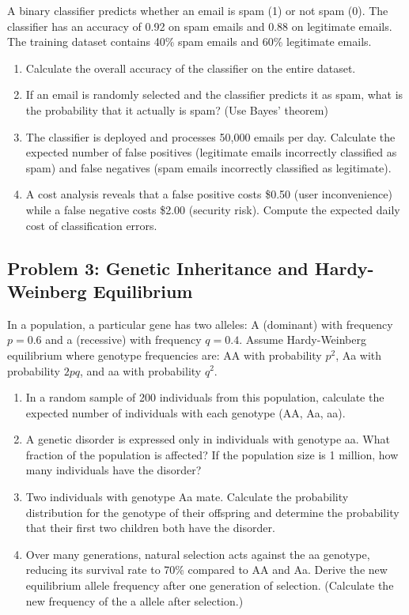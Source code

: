 \documentclass[12pt]{article}
\begin{document}
A binary classifier predicts whether an email is spam (1) or not spam (0). The classifier has an accuracy of 0.92 on spam emails and 0.88 on legitimate emails. The training dataset contains 40\% spam emails and 60\% legitimate emails.

\begin{enumerate}[label=(\alph*)]
\item Calculate the overall accuracy of the classifier on the entire dataset.

\item If an email is randomly selected and the classifier predicts it as spam, what is the probability that it actually is spam? (Use Bayes' theorem)

\item The classifier is deployed and processes 50,000 emails per day. Calculate the expected number of false positives (legitimate emails incorrectly classified as spam) and false negatives (spam emails incorrectly classified as legitimate).

\item A cost analysis reveals that a false positive costs \$0.50 (user inconvenience) while a false negative costs \$2.00 (security risk). Compute the expected daily cost of classification errors.
\end{enumerate}

\subsection*{Problem 3: Genetic Inheritance and Hardy-Weinberg Equilibrium}

In a population, a particular gene has two alleles: A (dominant) with frequency \(p = 0.6\) and a (recessive) with frequency \(q = 0.4\). Assume Hardy-Weinberg equilibrium where genotype frequencies are: AA with probability \(p^2\), Aa with probability \(2pq\), and aa with probability \(q^2\).

\begin{enumerate}[label=(\alph*)]
\item In a random sample of 200 individuals from this population, calculate the expected number of individuals with each genotype (AA, Aa, aa).

\item A genetic disorder is expressed only in individuals with genotype aa. What fraction of the population is affected? If the population size is 1 million, how many individuals have the disorder?

\item Two individuals with genotype Aa mate. Calculate the probability distribution for the genotype of their offspring and determine the probability that their first two children both have the disorder.

\item Over many generations, natural selection acts against the aa genotype, reducing its survival rate to 70\% compared to AA and Aa. Derive the new equilibrium allele frequency after one generation of selection. (Calculate the new frequency of the a allele after selection.)
\end{enumerate}
\end{document}
